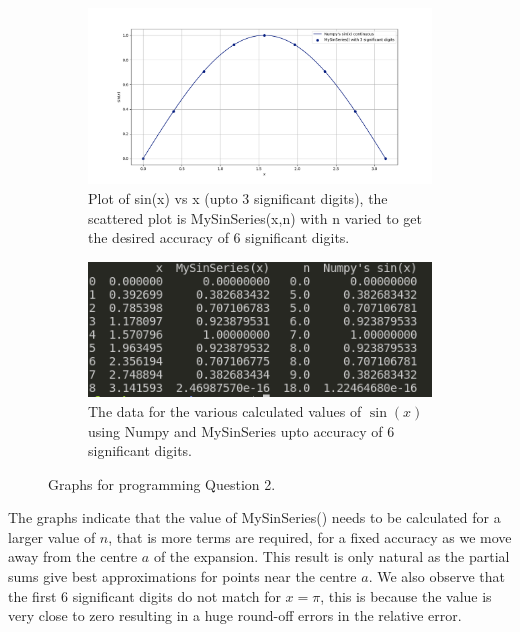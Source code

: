 \documentclass[12pt]{article}
\begin{document}
\begin{figure}[H]
\begin{subfigure}[b]{\textwidth}
	\centering
	\includegraphics[width=0.9\linewidth]{graph3}
	\caption{ \centering \small Plot of sin(x) vs x (upto 3 significant digits), the scattered plot is MySinSeries(x,n) with n varied to get the desired accuracy of 6 significant digits.}
	\label{fig:graph3}
\end{subfigure}

\begin{subfigure}[b]{\textwidth}
	\centering
	\includegraphics[width=0.9\linewidth]{output}
	\caption{ \small The data for the various calculated values of $ \sin (x) $ using Numpy and MySinSeries upto accuracy of 6 significant digits.}
	\label{fig:data}

\end{subfigure}
	\caption{ \small Graphs for programming Question 2.}
	\label{fig:fig3}
\end{figure}
The graphs indicate that the value of MySinSeries() needs to be calculated for a larger value of $n$, that is more terms are required, for a fixed accuracy as we move away from the centre $a$ of the expansion.
This result is only natural as the partial sums give best approximations for points near the centre $a$. We also observe that the first 6 significant digits do not match for $x = \pi $, this is because the value is very close to zero resulting in a huge round-off errors in the relative error.   
\end{document}
